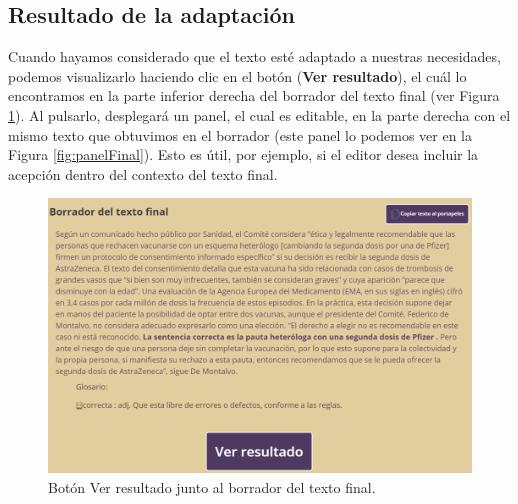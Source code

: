 \subsection{Resultado de la adaptación}
 
Cuando hayamos considerado que el texto esté adaptado a nuestras necesidades, podemos visualizarlo haciendo clic en el botón (\textbf{Ver resultado}), el cuál lo encontramos en la parte inferior derecha del borrador del texto final (ver Figura \ref{fig:botonResultado}). Al pulsarlo, desplegará un panel, el cual es editable, en la parte derecha con el mismo texto que obtuvimos en el borrador (este panel lo podemos ver en la Figura \ref{fig:panelFinal}). Esto es útil, por ejemplo, si el editor desea incluir la acepción dentro del contexto del texto final. 
\begin{figure}[h!]
	\centering
	
	
	\includegraphics[scale=0.8]{Imagenes/Figuras/verResultado}
	
	
	\caption{Botón Ver resultado junto al borrador del texto final.}
	\label{fig:botonResultado}
\end{figure}
